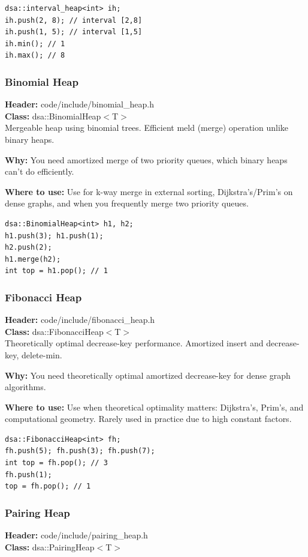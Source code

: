 \documentclass[11pt]{article}
\begin{document}
\begin{lstlisting}
dsa::interval_heap<int> ih;
ih.push(2, 8); // interval [2,8]
ih.push(1, 5); // interval [1,5]
ih.min(); // 1
ih.max(); // 8
\end{lstlisting}

\subsubsection{Binomial Heap}
\textbf{Header:} code/include/binomial\_heap.h\\
\textbf{Class:} dsa::BinomialHeap$<$T$>$\\

Mergeable heap using binomial trees. Efficient meld (merge) operation unlike binary heaps.

\textbf{Why:} You need amortized merge of two priority queues, which binary heaps can't do efficiently. \par \textbf{Where to use:} Use for k-way merge in external sorting, Dijkstra's/Prim's on dense graphs, and when you frequently merge two priority queues.

\begin{lstlisting}
dsa::BinomialHeap<int> h1, h2;
h1.push(3); h1.push(1);
h2.push(2);
h1.merge(h2);
int top = h1.pop(); // 1
\end{lstlisting}

\subsubsection{Fibonacci Heap}
\textbf{Header:} code/include/fibonacci\_heap.h\\
\textbf{Class:} dsa::FibonacciHeap$<$T$>$\\

Theoretically optimal decrease-key performance. Amortized insert and decrease-key, delete-min.

\textbf{Why:} You need theoretically optimal amortized decrease-key for dense graph algorithms. \par \textbf{Where to use:} Use when theoretical optimality matters: Dijkstra's, Prim's, and computational geometry. Rarely used in practice due to high constant factors.

\begin{lstlisting}
dsa::FibonacciHeap<int> fh;
fh.push(5); fh.push(3); fh.push(7);
int top = fh.pop(); // 3
fh.push(1);
top = fh.pop(); // 1
\end{lstlisting}

\subsubsection{Pairing Heap}
\textbf{Header:} code/include/pairing\_heap.h\\
\textbf{Class:} dsa::PairingHeap$<$T$>$\\
\end{document}
